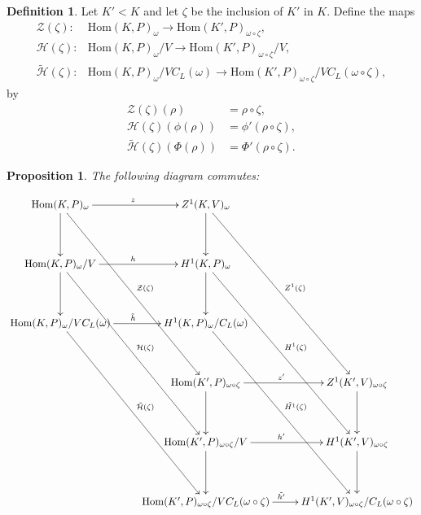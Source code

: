 \documentclass[12pt]{amsart}
\numberwithin{equation}{section}
\newtheorem{prop}[equation]{Proposition}
\theoremstyle{definition}
\newtheorem{defn}[equation]{Definition}
\theoremstyle{remark}
\theoremstyle{remark}
\begin{document}
\begin{defn} \label{main_cd} Let $K' < K$ and let $\zeta$ be the inclusion of $K'$ in $K$. Define the maps
\begin{align*}
\mathcal{Z}(\zeta):&\mathrm{Hom}(K, P)_\omega \rightarrow \mathrm{Hom}(K', P)_{\omega\circ\zeta}, \\
\mathcal{H}(\zeta):&\mathrm{Hom}(K, P)_\omega/V \rightarrow \mathrm{Hom}(K', P)_{\omega\circ\zeta}/V, \\
\tilde{\mathcal{H}}(\zeta):&\mathrm{Hom}(K, P)_\omega/VC_L(\omega) \rightarrow \mathrm{Hom}(K', P)_{\omega\circ\zeta}/VC_L(\omega\circ\zeta),
\end{align*}
by
\begin{align*}
\mathcal{Z}(\zeta)(\rho) &= \rho\circ\zeta, \\
\mathcal{H}(\zeta)(\phi(\rho)) &= \phi'(\rho\circ\zeta), \\
\tilde{\mathcal{H}}(\zeta)(\Phi(\rho)) &= \Phi'(\rho\circ\zeta).
\end{align*}
\end{defn}

\begin{prop} The following diagram commutes:
\par\nobreak
{\small
\setlength{\abovedisplayskip}{6pt}
\setlength{\belowdisplayskip}{\abovedisplayskip}
\setlength{\abovedisplayshortskip}{3pt}
\setlength{\belowdisplayshortskip}{\abovedisplayshortskip}
\begin{align*}
\xymatrix@R=40pt{
\mathrm{Hom}(K, P)_\omega \ar[r]^{z} \ar[d] \ar[dddr]^{\mathcal{Z}(\zeta)} & Z^1(K, V)_\omega \ar[d] \ar[dddr]^{Z^1(\zeta)} & \\
\mathrm{Hom}(K, P)_\omega/V \ar[r]^{h} \ar[d] \ar[dddr]^{\mathcal{H}(\zeta)} & H^1(K, P)_\omega \ar[d] \ar[dddr]^{H^1(\zeta)} & \\
\mathrm{Hom}(K, P)_\omega/VC_L(\omega) \ar[r]^{\tilde{h}} \ar[dddr]^{\tilde{\mathcal{H}}(\zeta)} & H^1(K, P)_\omega/C_L(\omega) \ar[dddr]^{\tilde{H^1}(\zeta)} & \\
& \mathrm{Hom}(K', P)_{\omega\circ\zeta} \ar[r]^{z'} \ar[d] & Z^1(K', V)_{\omega\circ\zeta} \ar[d] \\
& \mathrm{Hom}(K', P)_{\omega\circ\zeta}/V \ar[r]^{h'} \ar[d] & H^1(K', V)_{\omega\circ\zeta} \ar[d] \\
& \mathrm{Hom}(K', P)_{\omega\circ\zeta}/VC_L(\omega\circ\zeta) \ar[r]^{\tilde{h'}} & H^1(K', V)_{\omega\circ\zeta}/C_L(\omega\circ\zeta) \\
}
\end{align*}
}%
\end{prop}
\end{document}
